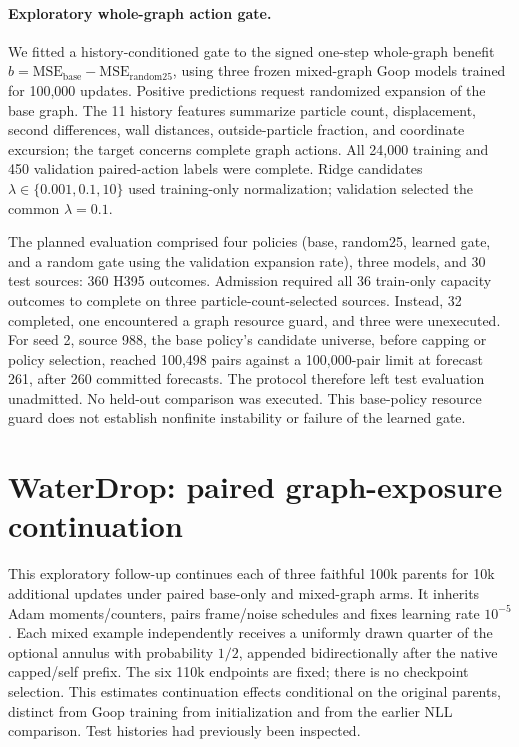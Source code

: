 \paragraph{Exploratory whole-graph action gate.}
We fitted a history-conditioned gate to the signed one-step whole-graph
benefit $b=\mathrm{MSE}_{\mathrm{base}}-\mathrm{MSE}_{\mathrm{random25}}$,
using three frozen mixed-graph Goop models trained for 100,000 updates.
Positive predictions request randomized expansion of the base graph.
The 11 history features summarize particle count, displacement,
second differences, wall distances, outside-particle fraction,
and coordinate excursion; the target concerns complete graph actions.
All 24,000 training and 450 validation paired-action labels were complete.
Ridge candidates $\lambda\in\{0.001,0.1,10\}$ used training-only
normalization; validation selected the common $\lambda=0.1$.

The planned evaluation comprised four policies (base, random25, learned
gate, and a random gate using the validation expansion rate), three models, and
30 test sources: 360 H395 outcomes. Admission required all 36 train-only
capacity outcomes to complete on three particle-count-selected sources.
Instead, 32 completed, one encountered a graph resource guard, and three
were unexecuted. For seed 2, source 988, the base policy's candidate
universe, before capping or policy selection, reached 100,498 pairs against
a 100,000-pair limit at forecast
261, after 260 committed forecasts. The protocol therefore left test
evaluation unadmitted. No held-out comparison was executed. This base-policy resource guard
does not establish nonfinite instability or failure of the learned gate.

\section{WaterDrop: paired graph-exposure continuation}
\label{sec:waterdrop-110k-exposure}
This exploratory follow-up continues each of three faithful 100k parents for 10k additional updates under paired base-only and mixed-graph arms. It inherits Adam moments/counters, pairs frame/noise schedules and fixes learning rate $10^{-5}$. Each mixed example independently receives a uniformly drawn quarter of the optional annulus with probability $1/2$, appended bidirectionally after the native capped/self prefix. The six 110k endpoints are fixed; there is no checkpoint selection. This estimates continuation effects conditional on the original parents, distinct from Goop training from initialization and from the earlier NLL comparison. Test histories had previously been inspected.

